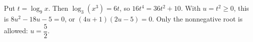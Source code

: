 Put $t=\log_9x$. Then $\log_3(x^3)=6t$, so $16t^4=36t^2+10$. With $u=t^2\ge0$, this is $8u^2-18u-5=0$, or $(4u+1)(2u-5)=0$. Only the nonnegative root is allowed: $\boxed{u=\dfrac{5}{2}}$.
